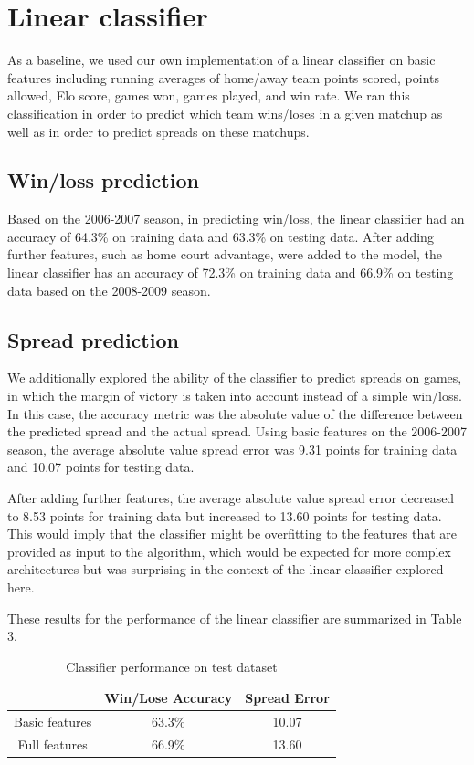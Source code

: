 \documentclass{article}
\begin{document}
\section{Linear classifier}
As a baseline, we used our own implementation of a linear classifier on basic features including running averages of home/away team points scored, points allowed, Elo score, games won, games played, and win rate. We ran this classification in order to predict which team wins/loses in a given matchup as well as in order to predict spreads on these matchups.

\subsection{Win/loss prediction}
Based on the 2006-2007 season, in predicting win/loss, the linear classifier had an accuracy of 64.3\% on training data and 63.3\% on testing data. After adding further features, such as home court advantage, were added to the model, the linear classifier has an accuracy of 72.3\% on training data and 66.9\% on testing data based on the 2008-2009 season.

\subsection{Spread prediction}

We additionally explored the ability of the classifier to predict spreads on games, in which the margin of victory is taken into account instead of a simple win/loss. In this case, the accuracy metric was the absolute value of the difference between the predicted spread and the actual spread. Using basic features on the 2006-2007 season, the average absolute value spread error was 9.31 points for training data and 10.07 points for testing data.

After adding further features, the average absolute value spread error decreased to 8.53 points for training data but increased to 13.60 points for testing data. This would imply that the classifier might be overfitting to the features that are provided as input to the algorithm, which would be expected for more complex architectures but was surprising in the context of the linear classifier explored here.

These results for the performance of the linear classifier are summarized in Table 3.
\begin{table}
  \begin{center}
    \begin{tabular}{ | c | c | c | }
      \hline
                      & Win/Lose Accuracy & Spread Error  \\ \hline
      Basic features  & 63.3\%            & 10.07         \\ \hline
      Full features  & 66.9\%            & 13.60         \\ \hline
    \end{tabular}
  \end{center}
  \caption{Classifier performance on test dataset}
\end{table}
\end{document}
